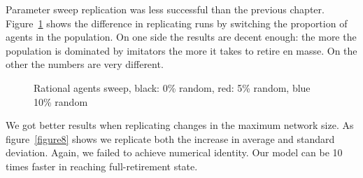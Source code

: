 \documentclass[runningheads,a4paper]{article}
\begin{document}
Parameter sweep replication was less successful than the previous chapter.
Figure~\ref{figure6} shows the difference in replicating runs by switching the proportion of agents in the population.
On one side the results are decent enough: the more the population is dominated by imitators the more it takes to retire en masse.
On the other the numbers are very different.

\begin{figure}
\centering

\caption{Rational agents sweep, black: 0\% random, red: 5\% random, blue 10\% random}
\label{figure6}
\end{figure}

We got better results when replicating changes in the maximum network size.
As figure~\ref{figure8} shows we replicate both the increase in average and standard deviation.
Again, we failed to achieve numerical identity.
Our model can be 10 times faster in reaching full-retirement state.
\end{document}
